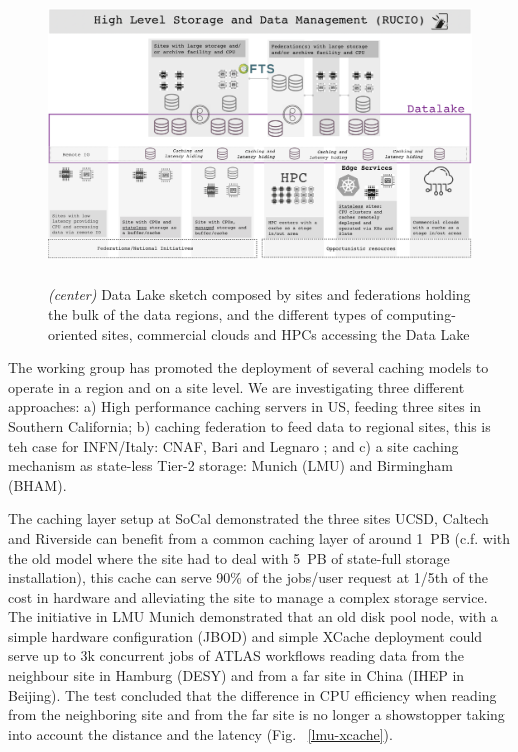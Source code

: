 \begin{figure}
  \centering
  \includegraphics[height=7.8cm]{datalake-sketch-square.png}
  \caption{{\em (center)} Data Lake sketch composed by sites and federations holding the bulk of the data regions, and the different types of computing-oriented sites, commercial clouds and HPCs accessing the Data Lake }
  \label{datalake-sketch}
\end{figure}
The working group has promoted the deployment of several caching models to operate in a region and on a site level. We are investigating three different approaches: a) High performance caching servers in US, feeding three sites in Southern California; b) caching federation to feed data to regional sites, this is teh case for INFN/Italy: CNAF, Bari and Legnaro ; and c) a site caching mechanism as state-less Tier-2 storage: Munich (LMU) and Birmingham (BHAM). 

The caching layer setup at SoCal demonstrated the three sites UCSD, Caltech and Riverside can benefit from a common caching layer of around 1~PB (c.f. with the old model where the site had to deal with 5~PB of state-full storage installation), this cache can serve 90\% of the jobs/user request at 1/5th of the cost in hardware and alleviating the site to manage a complex storage service.\\
The initiative in LMU Munich demonstrated that an old disk pool node, with a simple hardware configuration (JBOD) and simple XCache deployment could serve up to 3k concurrent jobs of ATLAS workflows reading data from the neighbour site in Hamburg (DESY) and from a far site in China (IHEP in Beijing). The test concluded that the difference in CPU efficiency when reading from the neighboring site and from the far site is no longer a showstopper taking into account the distance and the latency (Fig. ~\ref{lmu-xcache}).\\

